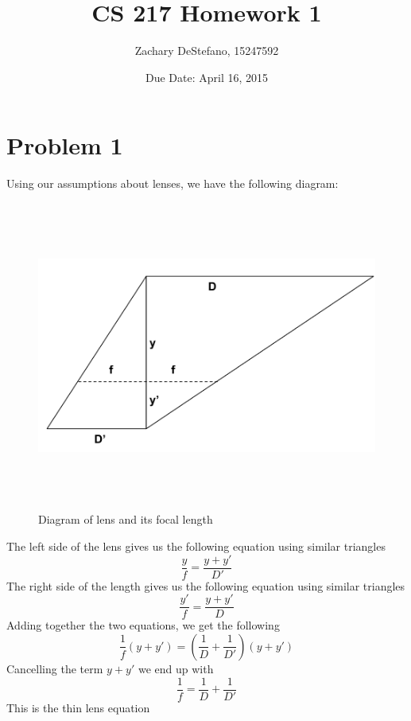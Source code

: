 \documentclass[11pt,psfig]{article}
\begin{document}
\setlength{\parskip}{1.2ex plus0.3ex minus 0.3ex}


\thispagestyle{empty} \pagestyle{myheadings} 



\title{CS 217 Homework 1}
\author{Zachary DeStefano, 15247592}
\date{Due Date: April 16, 2015}

\maketitle

\vfill\eject

\newpage

\section*{Problem 1}

Using our assumptions about lenses, we have the following diagram:

\begin{figure}[H]
\centering
\includegraphics[height=4in]{hw1prob1diagram.png}
\caption{Diagram of lens and its focal length}
\end{figure}

The left side of the lens gives us the following equation using similar triangles
\[
\frac{y}{f} = \frac{y+y'}{D'}
\]
The right side of the length gives us the following equation using similar triangles
\[
\frac{y'}{f} = \frac{y+y'}{D}
\]
Adding together the two equations, we get the following
\[
\frac{1}{f} (y + y') = (\frac{1}{D} + \frac{1}{D'})(y + y')
\]
Cancelling the term $y+y'$ we end up with
\[
\frac{1}{f} = \frac{1}{D} + \frac{1}{D'}
\]
This is the thin lens equation
\end{document}
